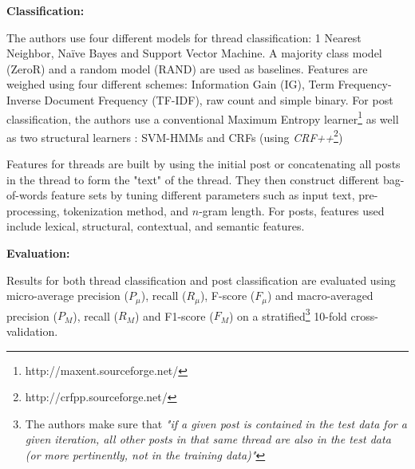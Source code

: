 \vspace{0.5cm}
\textbf{Classification:}
\vspace{0.1cm}

The authors use four different models for thread classification: 1 Nearest Neighbor, Naïve Bayes and Support Vector Machine. A majority class model (ZeroR) and a random model (RAND) are used as baselines. Features are weighed using four different schemes: Information Gain (IG), Term Frequency-Inverse Document Frequency (TF-IDF), raw count and simple binary. For post classification, the authors use a conventional Maximum Entropy learner\footnote{http://maxent.sourceforge.net/} as well as two structural learners : SVM-HMMs and CRFs (using \emph{CRF++}\footnote{http://crfpp.sourceforge.net/
})

Features for threads are built by using the initial post or concatenating all posts in the thread to form the "text" of the thread. They then construct different bag-of-words feature sets by tuning different parameters such as input text, pre-processing, tokenization method, and $n$-gram length. For posts, features used include lexical, structural, contextual, and semantic features.

\vspace{0.5cm}
\textbf{Evaluation:}
\vspace{0.1cm}

Results for both thread classification and post classification are evaluated using micro-average precision ($P_{\mu}$), recall ($R_{\mu}$), F-score ($F_{\mu}$) and macro-averaged precision ($P_{M}$), recall ($R_{M}$) and F1-score ($F_{M}$) on a stratified\footnote{The authors make sure that \textit{"if a given post is contained in the test data for a given iteration, all other posts in that same thread are also in the test data (or more pertinently, not in the training data)"}} 10-fold cross-validation.
